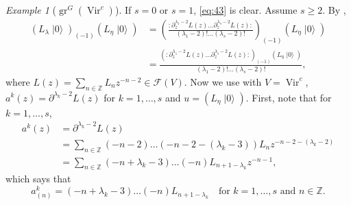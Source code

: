 \documentclass[a4paper, 12pt, reqno]{amsart}
\theoremstyle{remark}
\newtheorem{example}[theorem]{Example}
\numberwithin{equation}{subsection}
\DeclareMathOperator{\Vir}{Vir}
\DeclareMathOperator{\gr}{gr}
\DeclareMathOperator{\vac}{|0\rangle}
\begin{document}
\begin{example}[$\gr^G(\Vir^c)$]
  If $s = 0$ or $s = 1$, \eqref{eq:43} is clear.
  Assume $s \ge 2$.
  By ,
  \begin{align*}
    (L_\lambda\vac)_{(-1)}(L_{\eta}\vac) &= \left(\frac{:\partial_z^{\lambda_1 - 2}L(z)\dots\partial_z^{\lambda_s - 2}L(z):}{(\lambda_1 - 2)!\dots(\lambda_s - 2)!} \right)_{(-1)}(L_{\eta}\vac) \\
    &= \frac{(:\partial_z^{\lambda_1 - 2}L(z)\dots\partial_z^{\lambda_s - 2}L(z):)_{(-1)}(L_{\eta}\vac)}{(\lambda_1 - 2)!\dots(\lambda_s - 2)!},
  \end{align*}
  where $L(z) = \sum_{n \in \mathbb{Z}}L_nz^{-n - 2} \in \mathcal{F}(V)$.
  Now we use  with $V = \Vir^c$, $a^k(z) = \partial^{\lambda_k - 2}L(z)$ for $k = 1, \dots, s$ and $u = (L_{\eta}\vac)$.
  First, note that for $k = 1, \dots, s$,
  \begin{align*}
    a^k(z) &= \partial^{\lambda_k - 2}L(z) \\
    &= \sum_{n \in \mathbb{Z}}(-n - 2)\dots(-n - 2 - (\lambda_k - 3))L_nz^{-n - 2 - (\lambda_k - 2)} \\
    &= \sum_{n \in \mathbb{Z}}(-n + \lambda_k - 3)\dots(-n)L_{n + 1 - \lambda_k}z^{-n - 1},
  \end{align*}
  which says that
  \begin{equation*}
    a^k_{(n)} = (-n + \lambda_k - 3)\dots(-n)L_{n + 1 - \lambda_k} \quad \text{for }k = 1, \dots, s\text{ and }n \in \mathbb{Z}.
  \end{equation*}
  

\end{example}
\end{document}

